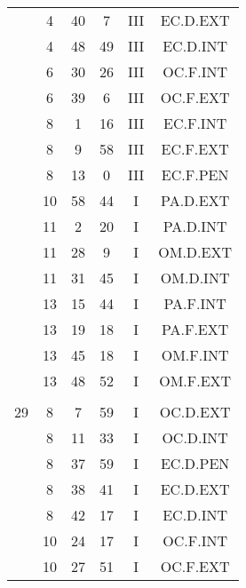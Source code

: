 \documentclass[12pt, a4paper]{article}
\begin{document}
\begin{multicols}{3}
{\begin{tabular}{c c c c c c}
	 	 	 	 & 4 & 40 & 7 & III & EC.D.EXT\\%
	 	 	 	 & 4 & 48 & 49 & III & EC.D.INT\\%
	 	 	 	 & 6 & 30 & 26 & III & OC.F.INT\\%
	 	 	 	 & 6 & 39 & 6 & III & OC.F.EXT\\%
	 	 	 	 & 8 & 1 & 16 & III & EC.F.INT\\%
	 	 	 	 & 8 & 9 & 58 & III & EC.F.EXT\\%
	 	 	 	 & 8 & 13 & 0 & III & EC.F.PEN\\%
	 	 	 	 & 10 & 58 & 44 & I & PA.D.EXT\\%
	 	 	 	 & 11 & 2 & 20 & I & PA.D.INT\\%
	 	 	 	 & 11 & 28 & 9 & I & OM.D.EXT\\%
	 	 	 	 & 11 & 31 & 45 & I & OM.D.INT\\%
	 	 	 	 & 13 & 15 & 44 & I & PA.F.INT\\%
	 	 	 	 & 13 & 19 & 18 & I & PA.F.EXT\\%
	 	 	 	 & 13 & 45 & 18 & I & OM.F.INT\\%
	 	 	 	 & 13 & 48 & 52 & I & OM.F.EXT\\%
	 	 	 	 & & & & & \\%
	 	 	 	29 & 8 & 7 & 59 & I & OC.D.EXT\\%
	 	 	 	 & 8 & 11 & 33 & I & OC.D.INT\\%
	 	 	 	 & 8 & 37 & 59 & I & EC.D.PEN\\%
	 	 	 	 & 8 & 38 & 41 & I & EC.D.EXT\\%
	 	 	 	 & 8 & 42 & 17 & I & EC.D.INT\\%
	 	 	 	 & 10 & 24 & 17 & I & OC.F.INT\\%
	 	 	 	 & 10 & 27 & 51 & I & OC.F.EXT\\%

\end{tabular}}
\end{multicols}
\end{document}

